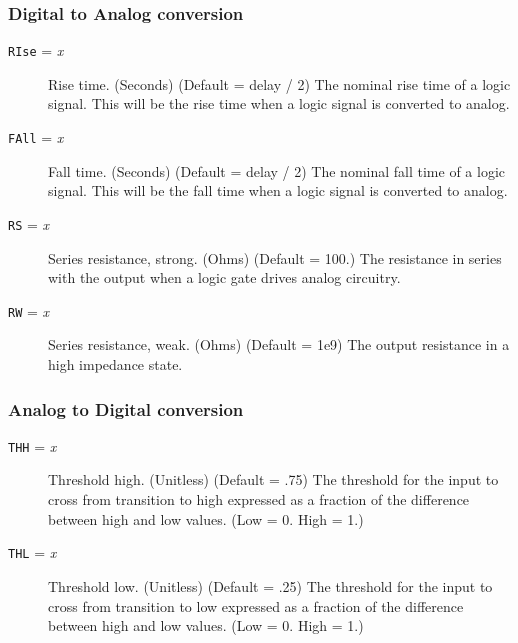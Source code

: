 \subsubsection{Digital to Analog conversion}
\begin{description}

\item[{\tt RIse} = {\it x}] Rise time. (Seconds) (Default = delay / 2) The
nominal rise time of a logic signal.  This will be the rise time when
a logic signal is converted to analog.

\item[{\tt FAll} = {\it x}] Fall time. (Seconds) (Default = delay / 2) The
nominal fall time of a logic signal.  This will be the fall time when a
logic signal is converted to analog.

\item[{\tt RS} = {\it x}] Series resistance, strong. (Ohms) (Default =
100.)  The resistance in series with the output when a logic gate drives
analog circuitry.

\item[{\tt RW} = {\it x}] Series resistance, weak. (Ohms) (Default = 1e9)
The output resistance in a high impedance state.

\end{description}
\subsubsection{Analog to Digital conversion}
\begin{description}

\item[{\tt THH} = {\it x}] Threshold high.  (Unitless) (Default = .75) The
threshold for the input to cross from transition to high expressed as a
fraction of the difference between high and low values.  (Low = 0.  High =
1.)

\item[{\tt THL} = {\it x}] Threshold low.  (Unitless) (Default = .25) The
threshold for the input to cross from transition to low expressed as a
fraction of the difference between high and low values.  (Low = 0.  High =
1.)

\end{description}
